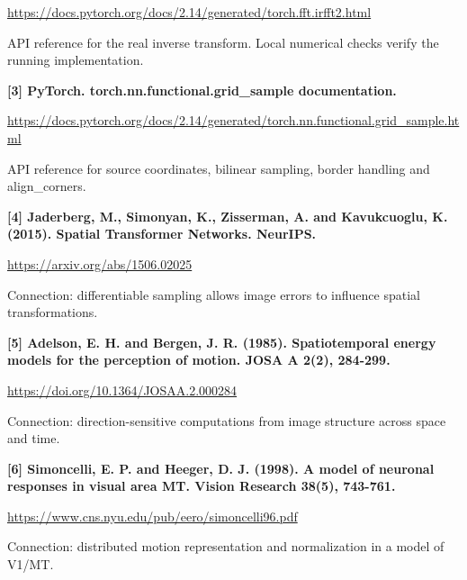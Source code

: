 \documentclass[11pt,letterpaper]{article}
\begin{document}
{
\small\color{muted} \href{https://docs.pytorch.org/docs/2.14/generated/torch.fft.irfft2.html}{https:/\allowbreak{}/\allowbreak{}docs.pytorch.org/\allowbreak{}docs/\allowbreak{}2.14/\allowbreak{}generated/\allowbreak{}torch.fft.irfft2.html}\par API reference for the real inverse transform. Local numerical checks verify the running implementation.\par}


\textbf{[3] PyTorch. torch.nn.functional.grid\_sample documentation.}


{
\small\color{muted} \href{https://docs.pytorch.org/docs/2.14/generated/torch.nn.functional.grid_sample.html}{https:/\allowbreak{}/\allowbreak{}docs.pytorch.org/\allowbreak{}docs/\allowbreak{}2.14/\allowbreak{}generated/\allowbreak{}torch.nn.functional.grid\_sample.html}\par API reference for source coordinates, bilinear sampling, border handling and align\_corners.\par}


\textbf{[4] Jaderberg, M., Simonyan, K., Zisserman, A. and Kavukcuoglu, K. (2015). Spatial Transformer Networks. NeurIPS.}


{
\small\color{muted} \href{https://arxiv.org/abs/1506.02025}{https:/\allowbreak{}/\allowbreak{}arxiv.org/\allowbreak{}abs/\allowbreak{}1506.02025}\par Connection: differentiable sampling allows image errors to influence spatial transformations.\par}


\textbf{[5] Adelson, E. H. and Bergen, J. R. (1985). Spatiotemporal energy models for the perception of motion. JOSA A 2(2), 284-299.}


{
\small\color{muted} \href{https://doi.org/10.1364/JOSAA.2.000284}{https:/\allowbreak{}/\allowbreak{}doi.org/\allowbreak{}10.1364/\allowbreak{}JOSAA.2.000284}\par Connection: direction-sensitive computations from image structure across space and time.\par}


\textbf{[6] Simoncelli, E. P. and Heeger, D. J. (1998). A model of neuronal responses in visual area MT. Vision Research 38(5), 743-761.}


{
\small\color{muted} \href{https://www.cns.nyu.edu/pub/eero/simoncelli96.pdf}{https:/\allowbreak{}/\allowbreak{}www.cns.nyu.edu/\allowbreak{}pub/\allowbreak{}eero/\allowbreak{}simoncelli96.pdf}\par Connection: distributed motion representation and normalization in a model of V1/\allowbreak{}MT.\par}
\end{document}

